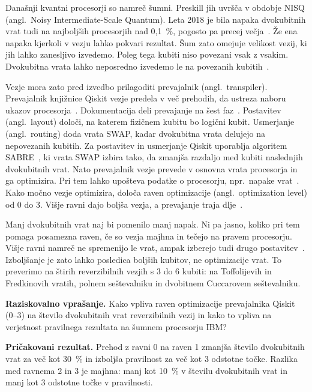 \documentclass[graybox, envcountchap]{svmult}
\begin{document}
Današnji kvantni procesorji so namreč šumni.
Preskill jih uvršča v obdobje NISQ
(angl.\ Noisy Intermediate-Scale Quantum).
Leta 2018 je bila napaka dvokubitnih vrat
tudi na najboljših procesorjih nad 0,1~\%,
pogosto pa precej večja~\cite{preskill2018}.
Že ena napaka kjerkoli v vezju lahko pokvari rezultat.
Šum zato omejuje velikost vezij,
ki jih lahko zanesljivo izvedemo.
Poleg tega kubiti niso povezani vsak z vsakim.
Dvokubitna vrata lahko neposredno izvedemo
le na povezanih kubitih~\cite{g10:qiskit_transpiler_stages}.

Vezje mora zato pred izvedbo prilagoditi
prevajalnik (angl.\ transpiler).
Prevajalnik knjižnice Qiskit vezje predela v več prehodih,
da ustreza naboru ukazov procesorja~\cite{qiskit2024}.
Dokumentacija deli prevajanje
na šest faz~\cite{g10:qiskit_transpiler_stages}.
Postavitev (angl.\ layout) določi,
na katerem fizičnem kubitu bo logični kubit.
Usmerjanje (angl.\ routing) doda vrata SWAP,
kadar dvokubitna vrata delujejo na nepovezanih kubitih.
Za postavitev in usmerjanje Qiskit uporablja
algoritem SABRE~\cite{g10:li2019sabre}, ki 
vrata SWAP izbira tako, da zmanjša razdaljo
med kubiti naslednjih dvokubitnih vrat.
Nato prevajalnik vezje prevede v osnovna vrata procesorja
in ga optimizira.
Pri tem lahko upošteva podatke o procesorju,
npr.\ napake vrat~\cite{qiskit2024}.
Kako močno vezje optimizira, določa
raven optimizacije (angl.\ optimization level) od 0 do 3.
Višje ravni dajo boljša vezja,
a prevajanje traja dlje~\cite{g10:qiskit_optimization}.

Manj dvokubitnih vrat naj bi pomenilo manj napak.
Ni pa jasno, koliko pri tem pomaga posamezna raven,
če so vezja majhna in tečejo na pravem procesorju.
Višje ravni namreč ne spremenijo le vrat,
ampak izberejo tudi drugo postavitev~\cite{g10:qiskit_optimization}.
Izboljšanje je zato lahko posledica boljših kubitov,
ne optimizacije vrat.
To preverimo na štirih reverzibilnih vezjih
s 3 do 6 kubiti:
na Toffolijevih in Fredkinovih vratih, polnem seštevalniku
in dvobitnem Cuccarovem seštevalniku.

\begin{svgraybox}
\textbf{Raziskovalno vprašanje.} Kako vpliva raven 
optimizacije prevajalnika Qiskit (0--3) na 
število dvokubitnih vrat reverzibilnih vezij 
in kako to vpliva na verjetnost pravilnega rezultata 
na šumnem procesorju IBM?

\textbf{Pričakovani rezultat.} Prehod z ravni 0 na raven 1 zmanjša 
število dvokubitnih vrat za več kot 30~\% in izboljša 
pravilnost za več kot 3 odstotne točke. 
Razlika med ravnema 2 in 3 je majhna: manj 
kot 10~\% v številu dvokubitnih vrat in manj kot 3 
odstotne točke v pravilnosti.
\end{svgraybox}
\end{document}
